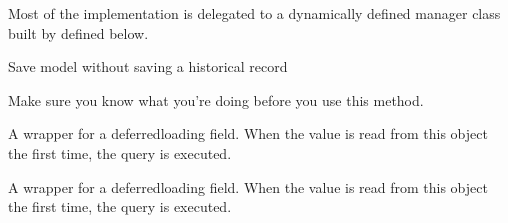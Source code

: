 \documentclass[letterpaper,10pt,english]{sphinxmanual}
\begin{document}
\begin{fulllineitems}
\begin{fulllineitems}
\sphinxAtStartPar
Most of the implementation is delegated to a dynamically defined manager
class built by  defined below.

\end{fulllineitems}


\begin{fulllineitems}
\label{\detokenize{pages_app.models:pages_app.models.block.Block.save_without_historical_record}}
\pysigstartsignatures
\pysiglinewithargsret
{}
{\sphinxparamcomma {}}
{}
\pysigstopsignatures
\sphinxAtStartPar
Save model without saving a historical record

\sphinxAtStartPar
Make sure you know what you’re doing before you use this method.

\end{fulllineitems}


\begin{fulllineitems}
\label{\detokenize{pages_app.models:id5}}
\pysigstartsignatures
\pysigline
{}
\pysigstopsignatures
\sphinxAtStartPar
A wrapper for a deferred\sphinxhyphen{}loading field. When the value is read from this
object the first time, the query is executed.

\end{fulllineitems}


\begin{fulllineitems}
\label{\detokenize{pages_app.models:id6}}
\pysigstartsignatures
\pysigline
{}
\pysigstopsignatures
\sphinxAtStartPar
A wrapper for a deferred\sphinxhyphen{}loading field. When the value is read from this
object the first time, the query is executed.

\end{fulllineitems}


\end{fulllineitems}
\end{document}
